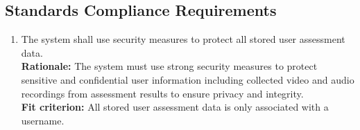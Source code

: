 \documentclass[12pt]{article}
\begin{document}
\subsection{Standards Compliance Requirements}
\begin{enumerate}[{CR-STD}1. ]
  \item The system shall use security measures to protect all stored user assessment data.\\
  \textbf{Rationale: }The system must use strong security measures to protect sensitive and confidential user information including collected video and audio recordings from assessment results to ensure privacy and integrity.\\
  \textbf{Fit criterion: }All stored user assessment data is only associated with a username. 

\end{enumerate}
\end{document}
